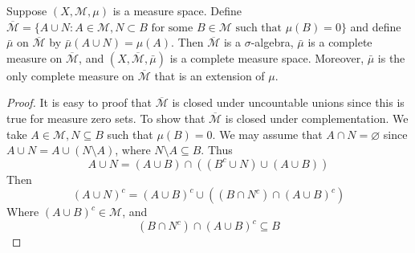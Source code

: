 \documentclass[../main.tex]{subfiles}
\begin{document}
\begin{theorem}{}{}
Suppose $(X,\mathcal{M},\mu)$ is a measure space. Define $\overline{\mathcal{M}} = \{A \cup N : A \in \mathcal{M}, N \subset B \text{ for some } B \in \mathcal{M} \text{ such that } \mu(B) = 0\}$ and define $\bar{\mu}$ on $\overline{\mathcal{M}}$ by $\bar{\mu}(A \cup N) = \mu(A)$. Then $\overline{\mathcal{M}}$ is a $\sigma$-algebra, $\bar{\mu}$ is a complete measure on $\overline{\mathcal{M}}$, and $(X,\overline{\mathcal{M}},\bar{\mu})$ is a complete measure space. Moreover, $\bar{\mu}$ is the only complete measure on $\overline{\mathcal{M}}$ that is an extension of $\mu$.
\end{theorem}

\begin{proof}
    It is easy to proof that \(  \overline{\mathcal{M}}  \) is closed under uncountable unions since  this is true for measure zero sets. To show that \(  \overline{\mathcal{M}}  \) is closed under complementation. We take \(  A\in \mathcal{M}, N\subseteq B  \) such that \(  \mu \left( B \right)= 0   \).  We may assume that \(  A\cap N= \varnothing  \) since \(  A\cup N=  A\cup \left( N\setminus A \right)   \), where \(  N\setminus A\subseteq B  \). Thus \[
 A\cup N= \left( A\cup B \right)\cap \left( \left( B^{c}\cup N \right)\cup \left( A\cup B \right)   \right)  
    \]Then \[
    \left( A\cup N \right)^{c}=  \left( A\cup B \right)^{c}\cup \left( \left( B\cap N ^{c}\right)\cap \left( A\cup B\right)^{c}   \right)   
    \]      Where \(  \left( A\cup B \right)^{c} \in \mathcal{M}   \), and \[
    \left( B\cap N^{c} \right)\cap \left( A\cup B \right)^{c}\subseteq B  
    \]
    

\end{proof}
\end{document}
